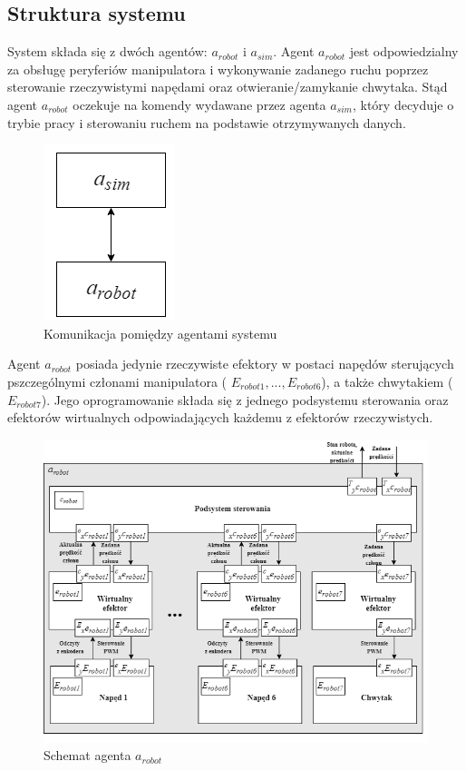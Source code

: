 \documentclass[a4paper, 12pt, twoside]{article}
\begin{document}
\subsection{Struktura systemu}

System składa się z dwóch agentów: $a_{robot}$ i $a_{sim}$. Agent $a_{robot}$ jest odpowiedzialny za obsługę peryferiów manipulatora i wykonywanie zadanego ruchu poprzez sterowanie rzeczywistymi napędami oraz otwieranie/zamykanie chwytaka. Stąd agent $a_{robot}$ oczekuje na komendy wydawane przez agenta $a_{sim}$, który decyduje o trybie pracy i sterowaniu ruchem na podstawie otrzymywanych danych.

\begin{figure}[hbt!]
\centering
\includegraphics[width=0.2\linewidth]{images/agent_comm.png}
\caption{Komunikacja pomiędzy agentami systemu}
\label{fig:agent_comm}
\end{figure}

Agent $a_{robot}$ posiada jedynie rzeczywiste efektory w postaci napędów sterujących pszczególnymi członami manipulatora ( $E_{robot1}, ...,  E_{robot6}$), a także chwytakiem ($E_{robot7}$). Jego oprogramowanie składa się z jednego podsystemu sterowania oraz efektorów wirtualnych odpowiadających każdemu z efektorów rzeczywistych.

\begin{figure}[hbt!]
\centering
\includegraphics[width=1.0\linewidth]{images/agent_robot.png}
\caption{Schemat agenta $a_{robot}$ }
\label{fig:agent_robot}
\end{figure}
\end{document}
